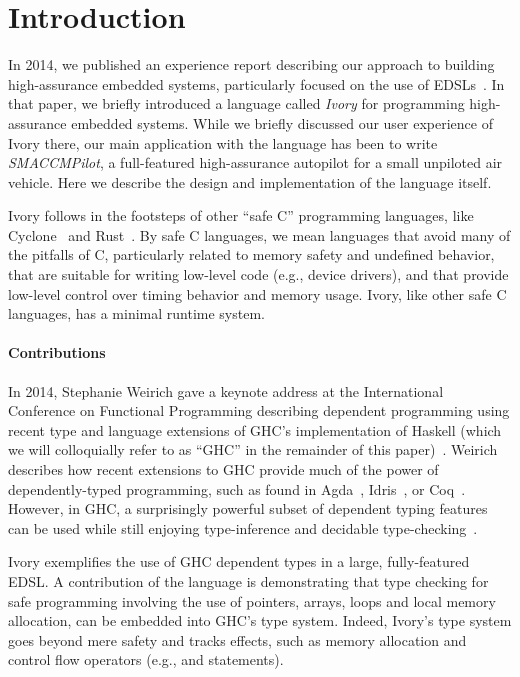 \section{Introduction}
\label{sec:introduction}


In 2014, we published an experience report describing our approach to building
high-assurance embedded systems, particularly focused on the use of
EDSLs~\cite{smaccm}. In that paper, we briefly introduced a language called
\emph{Ivory} for programming high-assurance embedded systems. While we briefly
discussed our user experience of Ivory there, our main application with the
language has been to write \emph{SMACCMPilot}, a full-featured high-assurance
autopilot for a small unpiloted air vehicle. Here we describe the design and
implementation of the language itself.

Ivory follows in the footsteps of other ``safe C'' programming languages, like
Cyclone~\cite{cyclone} and Rust~\cite{rust}. By safe C languages, we mean
languages that avoid many of the pitfalls of C, particularly related to memory
safety and undefined behavior, that are suitable for writing low-level code
(e.g., device drivers), and that provide low-level control over timing behavior
and memory usage. Ivory, like other safe C languages, has a minimal runtime
system.

\paragraph{Contributions}
In 2014, Stephanie Weirich gave a keynote address at the International
Conference on Functional Programming describing dependent programming using
recent type and language extensions of GHC's implementation of Haskell (which we
will colloquially refer to as ``GHC'' in the remainder of this
paper)~\cite{weirich-keynote}. Weirich describes how recent extensions to GHC
provide much of the power of dependently-typed programming, such as found in
Agda~\cite{agda}, Idris~\cite{idris}, or Coq~\cite{coq}. However, in GHC, a surprisingly
powerful subset of dependent typing features can be used while still enjoying
type-inference and decidable type-checking~\cite{dephaskell}.

Ivory exemplifies the use of GHC dependent types in a large, fully-featured
EDSL. A contribution of the language is demonstrating that type checking for
safe programming involving the use of pointers, arrays, loops and local memory
allocation, can be embedded into GHC's type system. Indeed, Ivory's type system
goes beyond mere safety and tracks effects, such as memory allocation and
control flow operators (e.g.,  and  statements).

